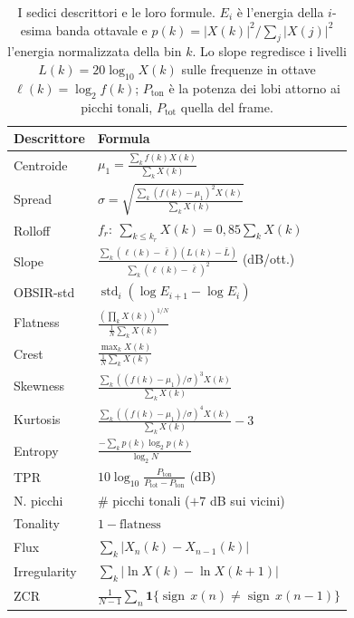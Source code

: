 \documentclass{article}
\begin{document}
\begin{table}[t]
\centering
\footnotesize
\setlength{\tabcolsep}{5pt}
\renewcommand{\arraystretch}{1.2}
\begin{tabular*}{\columnwidth}{@{\extracolsep{\fill}}ll@{}}
\toprule
\textbf{Descrittore} & \textbf{Formula} \\
\midrule
Centroide & $\mu_1=\frac{\sum_k f(k)X(k)}{\sum_k X(k)}$ \\[7pt]
Spread & $\sigma=\sqrt{\frac{\sum_k (f(k)-\mu_1)^2 X(k)}{\sum_k X(k)}}$ \\[7pt]
Rolloff & $f_r:\ \sum_{k\le k_r}X(k)=0{,}85\sum_k X(k)$ \\[4pt]
Slope & $\frac{\sum_k(\ell(k)-\bar\ell)(L(k)-\bar L)}{\sum_k(\ell(k)-\bar\ell)^2}$ (dB/ott.) \\[7pt]
OBSIR-std & $\operatorname{std}_i(\log E_{i+1}-\log E_i)$ \\[2pt]
Flatness & $\frac{(\prod_k X(k))^{1/N}}{\frac{1}{N}\sum_k X(k)}$ \\[8pt]
Crest & $\frac{\max_k X(k)}{\frac{1}{N}\sum_k X(k)}$ \\[8pt]
Skewness & $\frac{\sum_k((f(k)-\mu_1)/\sigma)^3 X(k)}{\sum_k X(k)}$ \\[7pt]
Kurtosis & $\frac{\sum_k((f(k)-\mu_1)/\sigma)^4 X(k)}{\sum_k X(k)}-3$ \\[7pt]
Entropy & $\frac{-\sum_k p(k)\log_2 p(k)}{\log_2 N}$ \\[6pt]
TPR & $10\log_{10}\frac{P_{\mathrm{ton}}}{P_{\mathrm{tot}}-P_{\mathrm{ton}}}$ (dB) \\[7pt]
N. picchi & \# picchi tonali ($+7$ dB sui vicini) \\[3pt]
Tonality & $1-\text{flatness}$ \\[2pt]
Flux & $\sum_k |X_n(k)-X_{n-1}(k)|$ \\[4pt]
Irregularity & $\sum_k |\ln X(k)-\ln X(k+1)|$ \\[4pt]
ZCR & $\frac{1}{N-1}\sum_n \mathbf{1}\{\operatorname{sign}\,x(n)\neq\operatorname{sign}\,x(n-1)\}$ \\[2pt]
\bottomrule
\end{tabular*}
\caption{I sedici descrittori e le loro formule. $E_i$ è l'energia della $i$-esima banda ottavale e \mbox{$p(k)=|X(k)|^2/\sum_j|X(j)|^2$} l'energia normalizzata della bin $k$. Lo slope regredisce i livelli \mbox{$L(k)=20\log_{10}X(k)$} sulle frequenze in ottave \mbox{$\ell(k)=\log_2 f(k)$}; $P_{\mathrm{ton}}$ è la potenza dei lobi attorno ai picchi tonali, $P_{\mathrm{tot}}$ quella del frame.}
\label{tab:descrittori}
\end{table}
\end{document}
